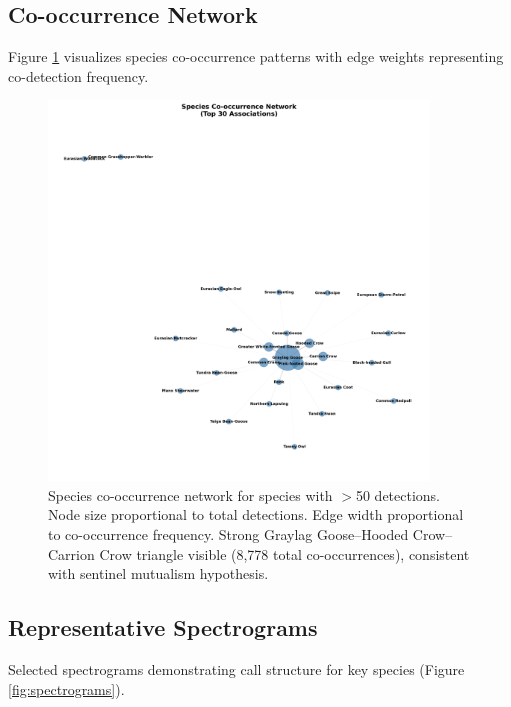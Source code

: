 \documentclass[twocolumn]{article}
\begin{document}
\subsection{Co-occurrence Network}

Figure \ref{fig:cooccurrence} visualizes species co-occurrence patterns with edge weights representing co-detection frequency.

\begin{figure}[H]
\centering
\includegraphics[width=0.9\textwidth]{figures/cooccurrence_network.png}
\caption{Species co-occurrence network for species with $>$50 detections. Node size proportional to total detections. Edge width proportional to co-occurrence frequency. Strong Graylag Goose--Hooded Crow--Carrion Crow triangle visible (8,778 total co-occurrences), consistent with sentinel mutualism hypothesis.}
\label{fig:cooccurrence}
\end{figure}

\subsection{Representative Spectrograms}

Selected spectrograms demonstrating call structure for key species (Figure \ref{fig:spectrograms}).
\end{document}
